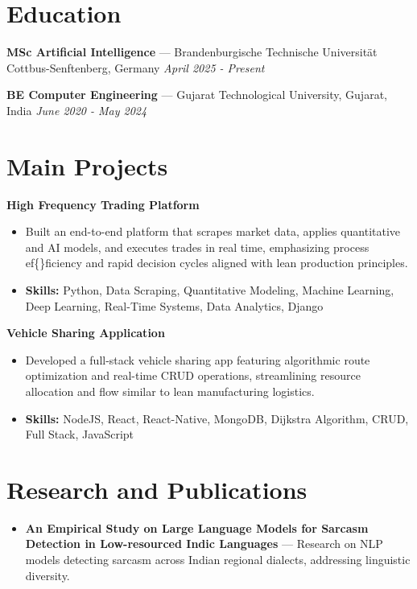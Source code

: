 \documentclass[a4paper,10pt]{article}
\begin{document}
\section*{Education}
\textbf{MSc Artificial Intelligence} — Brandenburgische Technische Universität Cottbus-Senftenberg, Germany \hfill \textit{April 2025 - Present}\par
\vspace{1.5pt}
\textbf{BE Computer Engineering} — Gujarat Technological University, Gujarat, India \hfill \textit{June 2020 - May 2024}\par

\section*{Main Projects}
\textbf{High Frequency Trading Platform}\par
\vspace{1pt}
\begin{itemize}
  \item Built an end-to-end platform that scrapes market data, applies quantitative and AI models, and executes trades in real time, emphasizing process ef\{\}ficiency and rapid decision cycles aligned with lean production principles.
  \item \textbf{Skills:} Python, Data Scraping, Quantitative Modeling, Machine Learning, Deep Learning, Real-Time Systems, Data Analytics, Django
\end{itemize}
\vspace{3pt}
\textbf{Vehicle Sharing Application}\par
\vspace{1pt}
\begin{itemize}
  \item Developed a full-stack vehicle sharing app featuring algorithmic route optimization and real-time CRUD operations, streamlining resource allocation and flow similar to lean manufacturing logistics.
  \item \textbf{Skills:} NodeJS, React, React-Native, MongoDB, Dijkstra Algorithm, CRUD, Full Stack, JavaScript
\end{itemize}

\section*{Research and Publications}
\begin{itemize}
\item \textbf{An Empirical Study on Large Language Models for Sarcasm Detection in Low-resourced Indic Languages} — Research on NLP models detecting sarcasm across Indian regional dialects, addressing linguistic diversity.
\end{itemize}
\end{document}
